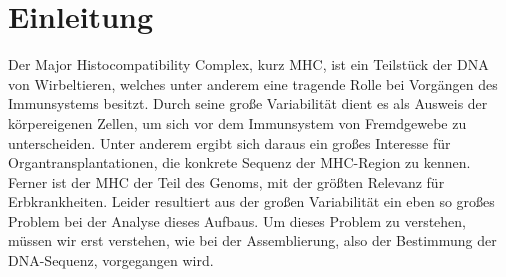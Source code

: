 \section{Einleitung} \raggedbottom 
Der Major Histocompatibility Complex, kurz MHC, ist ein Teilstück der DNA von Wirbeltieren, welches unter anderem eine tragende Rolle bei Vorgängen des Immunsystems besitzt. Durch seine große Variabilität dient es als Ausweis der körpereigenen Zellen, um sich vor dem Immunsystem von Fremdgewebe zu unterscheiden. Unter anderem ergibt sich daraus ein großes Interesse für Organtransplantationen, die konkrete Sequenz der MHC-Region zu kennen. Ferner ist der MHC der Teil des Genoms, mit der größten Relevanz für Erbkrankheiten. 
Leider resultiert aus der großen Variabilität ein eben so großes Problem bei der Analyse dieses Aufbaus. Um dieses Problem zu verstehen, müssen wir erst verstehen, wie bei der Assemblierung, also der Bestimmung der DNA-Sequenz, vorgegangen wird.\\


